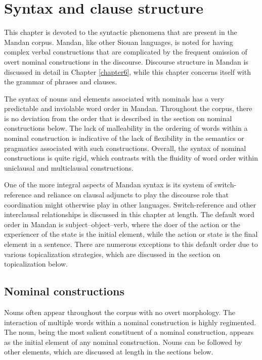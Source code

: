 \chapter{Syntax and clause structure}\label{chapter5}

This chapter is devoted to the syntactic phenomena that are present in the Mandan corpus. Mandan, like other Siouan languages, is noted for having complex verbal constructions that are complicated by the frequent omission of overt nominal constructions in the discourse. Discourse structure in Mandan is discussed in detail in Chapter \ref{chapter6}, while this chapter concerns itself with the grammar of phrases and clauses.

The syntax of nouns and elements associated with nominals has a very predictable and inviolable word order in Mandan. Throughout the corpus, there is no deviation from the order that is described in the section on nominal constructions below. The lack of malleability in the ordering of words within a nominal construction is indicative of the lack of flexibility in the semantics or pragmatics associated with such constructions. Overall, the syntax of nominal constructions is quite rigid, which contrasts with the fluidity of word order within uniclausal and multiclausal constructions. 

One of the more integral aspects of Mandan syntax is its system of switch-reference and reliance on clausal adjuncts to play the discourse role that coordination might otherwise play in other languages. Switch-reference and other interclausal relationships is discussed in this chapter at length. The default word order in Mandan is subject--object--verb, where the doer of the action or the experiencer of the state is the initial element, while the action or state is the final element in a sentence. There are numerous exceptions to this default order due to various topicalization strategies, which are discussed in the section on topicalization below.

\section{Nominal constructions}\label{Ch5Nouns}

Nouns often appear throughout the corpus with no overt morphology. The interaction of multiple words within a nominal construction is highly regimented. The noun, being the most salient constituent of a nominal construction, appears as the initial element of any nominal construction. Nouns can be followed by other elements, which are discussed at length in the sections below.

